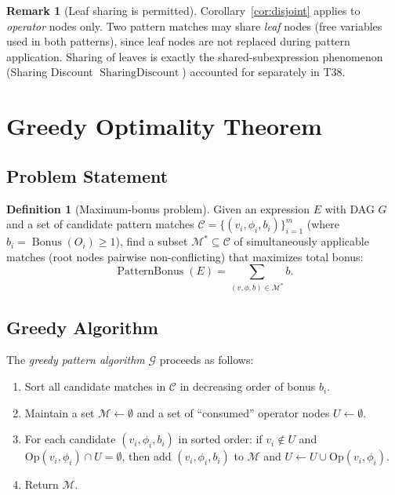 \documentclass[12pt,a4paper]{article}
\theoremstyle{definition}
\newtheorem{definition}[theorem]{Definition}
\newtheorem{remark}[theorem]{Remark}
\newcommand{\Bonus}{\operatorname{Bonus}}
\newcommand{\PB}{\operatorname{PatternBonus}}
\newcommand{\SD}{\operatorname{SharingDiscount}}
\begin{document}
\begin{remark}[Leaf sharing is permitted]
Corollary~\ref{cor:disjoint} applies to \emph{operator} nodes only.
Two pattern matches may share \emph{leaf} nodes (free variables used in
both patterns), since leaf nodes are not replaced during pattern
application.  Sharing of leaves is exactly the shared-subexpression
phenomenon (Sharing Discount $\SD$) accounted for separately in T38.
\end{remark}

\section{Greedy Optimality Theorem}
\label{sec:greedy}

\subsection{Problem Statement}

\begin{definition}[Maximum-bonus problem]
\label{def:maxbonus}
Given an expression $E$ with DAG $G$ and a set of candidate pattern
matches $\mathcal{C} = \{(v_i, \phi_i, b_i)\}_{i=1}^{m}$ (where $b_i
= \Bonus(O_i) \geq 1$), find a subset
$\mathcal{M}^* \subseteq \mathcal{C}$ of simultaneously applicable
matches (root nodes pairwise non-conflicting) that maximizes total bonus:
\[
  \PB(E) = \sum_{(v,\phi,b) \in \mathcal{M}^*} b.
\]
\end{definition}

\subsection{Greedy Algorithm}

The \emph{greedy pattern algorithm} $\mathcal{G}$ proceeds as follows:
\begin{enumerate}
  \item Sort all candidate matches in $\mathcal{C}$ in decreasing order
        of bonus $b_i$.
  \item Maintain a set $\mathcal{M} \leftarrow \emptyset$ and a set of
        ``consumed'' operator nodes $U \leftarrow \emptyset$.
  \item For each candidate $(v_i, \phi_i, b_i)$ in sorted order:
        if $v_i \notin U$ and $\mathrm{Op}(v_i, \phi_i) \cap U = \emptyset$,
        then add $(v_i, \phi_i, b_i)$ to $\mathcal{M}$ and
        $U \leftarrow U \cup \mathrm{Op}(v_i, \phi_i)$.
  \item Return $\mathcal{M}$.
\end{enumerate}
\end{document}
